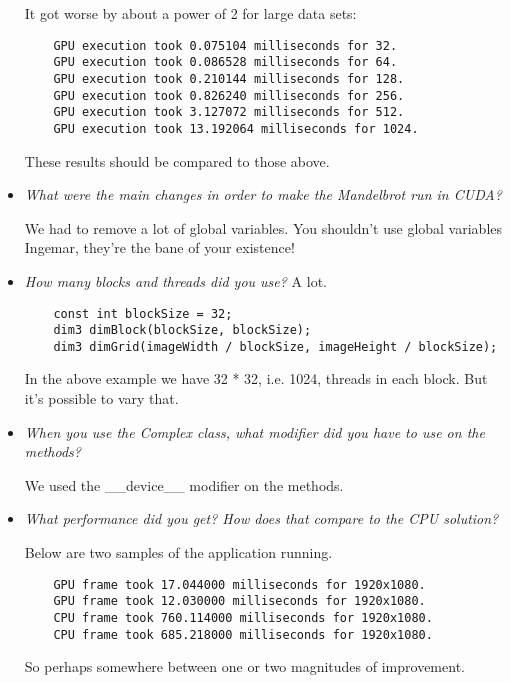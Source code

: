 \documentclass[a4paper,12pt]{article}
\begin{document}
\begin{itemize}
  It got worse by about a power of 2 for large data sets:

  \begin{lstlisting}
    GPU execution took 0.075104 milliseconds for 32.
    GPU execution took 0.086528 milliseconds for 64.
    GPU execution took 0.210144 milliseconds for 128.
    GPU execution took 0.826240 milliseconds for 256.
    GPU execution took 3.127072 milliseconds for 512.
    GPU execution took 13.192064 milliseconds for 1024.
  \end{lstlisting}

  These results should be compared to those above.


\item \textit{What were the main changes in order to make the Mandelbrot run in CUDA?}

We had to remove a lot of global variables. You shouldn't use global variables Ingemar, they're the bane of your existence!


\item \textit{How many blocks and threads did you use?}
  A lot.

  \begin{lstlisting}
    const int blockSize = 32;
    dim3 dimBlock(blockSize, blockSize);
    dim3 dimGrid(imageWidth / blockSize, imageHeight / blockSize);
  \end{lstlisting}

  In the above example we have 32 * 32, i.e. 1024, threads in each block. But it's possible to vary that.


\item \textit{When you use the Complex class, what modifier did you have to use on the methods?}

  We used the __device__ modifier on the methods.


\item \textit{What performance did you get? How does that compare to the CPU solution?}

  Below are two samples of the application running.

  \begin{lstlisting}
    GPU frame took 17.044000 milliseconds for 1920x1080.
    GPU frame took 12.030000 milliseconds for 1920x1080.
    CPU frame took 760.114000 milliseconds for 1920x1080.
    CPU frame took 685.218000 milliseconds for 1920x1080.
  \end{lstlisting}

  So perhaps somewhere between one or two magnitudes of improvement.



\end{itemize}
\end{document}
